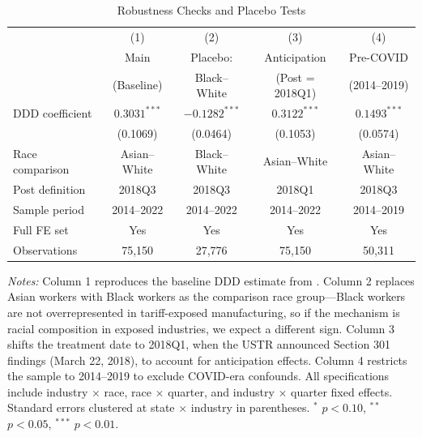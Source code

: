 \begin{table}[H]
\centering
\caption{Robustness Checks and Placebo Tests}
\begin{threeparttable}
\begin{tabular}{lcccc}
\toprule
 & (1) & (2) & (3) & (4) \\
 & Main & Placebo: & Anticipation & Pre-COVID \\
 & (Baseline) & Black--White & (Post = 2018Q1) & (2014--2019) \\
\midrule
DDD coefficient & $0.3031^{***}$ & $-0.1282^{***}$ & $0.3122^{***}$ & $0.1493^{***}$ \\
 & (0.1069) & (0.0464) & (0.1053) & (0.0574) \\
\midrule
Race comparison & Asian--White & Black--White & Asian--White & Asian--White \\
Post definition & 2018Q3 & 2018Q3 & 2018Q1 & 2018Q3 \\
Sample period & 2014--2022 & 2014--2022 & 2014--2022 & 2014--2019 \\
Full FE set & Yes & Yes & Yes & Yes \\
Observations & 75,150 & 27,776 & 75,150 & 50,311 \\
\bottomrule
\end{tabular}
\begin{tablenotes}[flushleft]
\small
\item \textit{Notes:} Column 1 reproduces the baseline DDD estimate from . Column 2 replaces Asian workers with Black workers as the comparison race group---Black workers are not overrepresented in tariff-exposed manufacturing, so if the mechanism is racial composition in exposed industries, we expect a different sign. Column 3 shifts the treatment date to 2018Q1, when the USTR announced Section 301 findings (March 22, 2018), to account for anticipation effects. Column 4 restricts the sample to 2014--2019 to exclude COVID-era confounds. All specifications include industry $\times$ race, race $\times$ quarter, and industry $\times$ quarter fixed effects. Standard errors clustered at state $\times$ industry in parentheses. $^{*}$ $p<0.10$, $^{**}$ $p<0.05$, $^{***}$ $p<0.01$.
\end{tablenotes}
\end{threeparttable}
\label{tab:robust}
\end{table}

